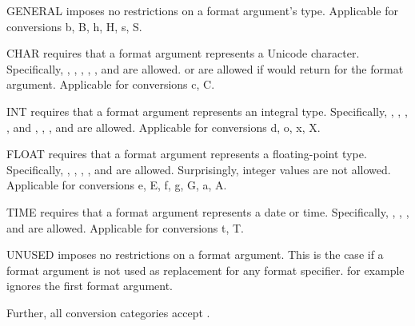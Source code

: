 \begin{description}
\item{GENERAL} imposes no restrictions on a format argument's type. Applicable for
    conversions b, B, h, H, s, S.

\item{CHAR} requires that a format argument represents a Unicode character.
    Specifically, , , ,
    , , and  are allowed.
     or  are allowed if
     would return 
    for the format argument. Applicable for conversions c, C.

\item{INT} requires that a format argument represents an integral type. Specifically,
    , , , ,
     and , ,
    , and  are allowed. Applicable for
    conversions d, o, x, X.  

\item{FLOAT} requires that a format argument represents a floating-point type.  Specifically,
    , , ,
    , and  are allowed. Surprisingly, integer
    values are not allowed. Applicable for
    conversions e, E, f, g, G, a, A.
 
\item{TIME} requires that a format argument represents a date or time.
    Specifically, , , , and
     are allowed.  Applicable for conversions t, T.

\item{UNUSED} imposes no restrictions on a format argument. This is the case if a
    format argument is not used as replacement for any format specifier.
     for example ignores the first format argument. 
\end{description}

\noindent Further, all conversion categories accept .


